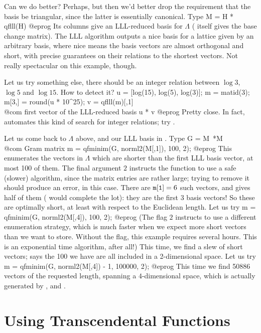 Can we do better? Perhaps, but then we'd better drop the requirement that
the basis be triangular, since the latter is essentially canonical. Type
\bprog
  M = H * qflll(H)
@eprog
Its columns give an LLL-reduced basis for $\Lambda$ ( itself
gives the base change matrix). The LLL algorithm outputs a nice basis for a
lattice given by an arbitrary basis, where nice means the basis vectors are
almost orthogonal and short, with precise guarantees on their relations to
the shortest vectors. Not really spectacular on this example, though.

Let us try something else, there should be an integer relation between
$\log 3$, $\log 5$ and $\log 15$. How to detect it?
\bprog
  u = [log(15), log(5), log(3)];
  m = matid(3); m[3,] = round(u * 10^25);
  v = qflll(m)[,1] \\@com first vector of the LLL-reduced basis
  u * v
@eprog\noindent
Pretty close. In fact,  automates this kind of search for integer
relations; try .

Let us come back to $\Lambda$ above, and our LLL basis in . Type
\bprog
  G = M~*M  \\@com Gram matrix
  m = qfminim(G, norml2(M[,1]), 100, 2);
@eprog\noindent
This enumerates the vectors in $\Lambda$ which are shorter than the first LLL
basis vector, at most 100 of them. The final argument $2$ instructs the
function to use a safe (slower) algorithm, since the matrix entries are
rather large; trying to remove it should produce an error, in this case.
There are ${\tt m[1]} = 6$ such vectors, and  gives half of them
( would complete the lot): they are the first 3 basis vectors! So
these are optimally short, at least with respect to the Euclidean length. Let
us try
\bprog
  m = qfminim(G, norml2(M[,4]), 100, 2);
@eprog\noindent
(The flag $2$ instructs  to use a different enumeration
strategy, which is much faster when we expect more short vectors than we want
to store. Without the flag, this example requires several hours. This is an
exponential time algorithm, after all!) This time, we find a slew of short
vectors;  says the 100 we have are all included in a
2-dimensional space. Let us try
\bprog
  m = qfminim(G, norml2(M[,4]) - 1, 100000, 2);
@eprog\noindent
This time we find 50886 vectors of the requested length, spanning a
$4$-dimensional space, which is actually generated by ,
  and .

\section{Using Transcendental Functions}

